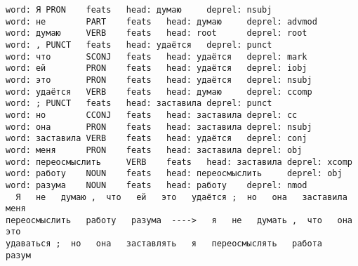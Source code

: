 \documentclass[11pt]{article}
\begin{document}
    \begin{Verbatim}[commandchars=\\\{\}]
word: Я PRON    feats   head: думаю     deprel: nsubj
word: не        PART    feats   head: думаю     deprel: advmod
word: думаю     VERB    feats   head: root      deprel: root
word: , PUNCT   feats   head: удаётся   deprel: punct
word: что       SCONJ   feats   head: удаётся   deprel: mark
word: ей        PRON    feats   head: удаётся   deprel: iobj
word: это       PRON    feats   head: удаётся   deprel: nsubj
word: удаётся   VERB    feats   head: думаю     deprel: ccomp
word: ; PUNCT   feats   head: заставила deprel: punct
word: но        CCONJ   feats   head: заставила deprel: cc
word: она       PRON    feats   head: заставила deprel: nsubj
word: заставила VERB    feats   head: удаётся   deprel: conj
word: меня      PRON    feats   head: заставила deprel: obj
word: переосмыслить     VERB    feats   head: заставила deprel: xcomp
word: работу    NOUN    feats   head: переосмыслить     deprel: obj
word: разума    NOUN    feats   head: работу    deprel: nmod
  Я   не   думаю ,  что   ей   это   удаётся ;  но   она   заставила   меня
переосмыслить   работу   разума  ---->   я   не   думать ,  что   она   это
удаваться ;  но   она   заставлять   я   переосмыслять   работа   разум
    \end{Verbatim}
\end{document}
